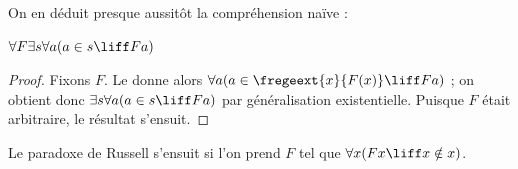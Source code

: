 \documentclass[../../../include/open-logic-section]{subfiles}
\begin{document}
On en déduit presque aussitôt la compréhension naïve :

\begin{lem}
$\forall F \exists s \forall a (a \in s \liff Fa)$
\end{lem}

\begin{proof}
Fixons $F$. Le  donne alors $\forall a (a \in
\fregeext{x}{F(x)} \liff Fa)$ ; on obtient donc
$\exists s\forall a(a \in s \liff Fa)$ par généralisation
existentielle. Puisque $F$ était arbitraire, le résultat s'ensuit.
\end{proof}

Le paradoxe de Russell s'ensuit si l'on prend $F$ tel que
$\forall x(Fx \liff x \notin x)$.
\end{document}
